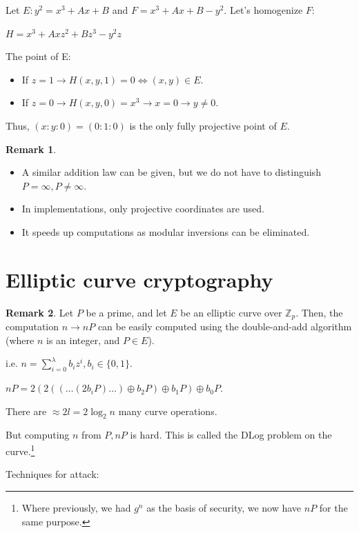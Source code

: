 \documentclass[11pt]{article}
\theoremstyle{definition}
\newtheorem{remark}{Remark}[section]
\theoremstyle{proof}
\begin{document}
Let $E:y^2 = x^3 + Ax + B$ and $F = x^3 + Ax + B - y^2$. Let's homogenize $F$:

$H = x^3 + Axz^2 + Bz^3 - y^2z$

The point of E:

\begin{itemize}
	\item If $z = 1 \rightarrow H(x, y, 1) = 0 \iff (x, y) \in E$.
	\item If $z = 0 \rightarrow H(x, y, 0) = x^3 \rightarrow x = 0 \rightarrow y \ne 0$.
\end{itemize}

Thus, $(x:y:0) = (0:1:0)$ is the only fully projective point of $E$.

\begin{remark}\leavevmode
	\begin{itemize}
		\item A similar addition law can be given, but we do not have to distinguish $P = \infty, P \ne \infty$.
		\item In implementations, only projective coordinates are used.
		\item It speeds up computations as modular inversions can be eliminated.
	\end{itemize}
\end{remark}

\section{Elliptic curve cryptography}

\begin{remark}
	Let $P$ be a prime, and let $E$ be an elliptic curve over $\mathbb{Z}_p$. Then, the computation $n \rightarrow nP$ can be easily computed using the double-and-add algorithm (where $n$ is an integer, and $P \in E$).
	
	i.e. $n = \sum_{i=0}^{\lambda} b_i z^i, b_i \in \{0, 1\}$.
	
	$nP = 2(2((\dots (2b_iP)\dots) \oplus b_2P) \oplus b_1P) \oplus b_0P$.
	
	There are $\approx 2l = 2\log_2n$ many curve operations.
	
	But computing $n$ from $P, nP$ is hard. This is called the DLog problem on the curve.\footnote{Where previously, we had $g^n$ as the basis of security, we now have $nP$ for the same purpose.}
\end{remark}

Techniques for attack:
\end{document}
